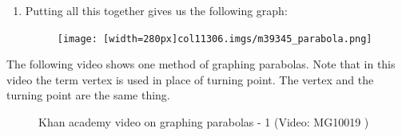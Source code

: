 {\begin{mdframed}[linewidth=4, leftmargin=40, rightmargin=40]
\begin{exercise}
\begin{enumerate}[noitemsep, label=\textbf{Step} \textbf{\arabic*}. ]
\item Putting all this together gives us the following graph:
\setcounter{subfigure}{0}
\begin{figure}[H] %
\begin{center}
\label{m39345*uid12459!!!underscore!!!media}\label{m39345*uid12459!!!underscore!!!printimage}\texttt{[image: [width=280px]col11306.imgs/m39345\_parabola.png]} %
\vspace{2pt}
\vspace{.1in}
\end{center}
\end{figure}       
\end{enumerate}
\end{exercise}
\end{mdframed}
}
\noindent
The following video shows one method of graphing parabolas. Note that in this video the term vertex is used in place of turning point. The vertex and the turning point are the same thing.
\setcounter{subfigure}{0}
\begin{figure}[H] %
\textnormal{Khan academy video on graphing parabolas - 1}\vspace{.1in} \nopagebreak
\label{m39345*yt-media1}\label{m39345*yt-video1}
 { (Video:  MG10019 )}
\vspace{2pt}
\vspace{.1in}
\end{figure}       \par 
